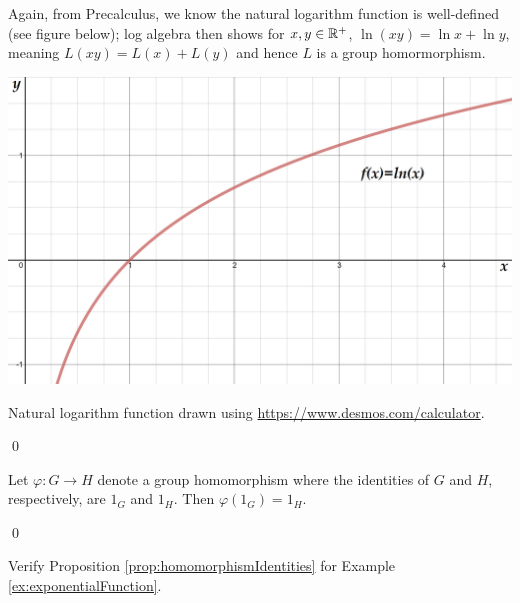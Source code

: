 \documentclass[../algebraNotesMSRI-UP2016.tex]{subfiles}
\begin{document}
\begin{frame}
Again, from Precalculus, we know the natural logarithm function is well-defined (see figure below); log algebra then shows for $x,y\in\mathbb R^+$, $\ln{(xy)}=\ln x+\ln y$, meaning $L(xy)=L(x)+L(y)$ and hence $L$ is a group homormorphism. 

\begin{center}
\includegraphics[scale=0.2]{lnFunction}

{\footnotesize Natural logarithm function drawn using \url{https://www.desmos.com/calculator}.}
\end{center}
\qed

\end{frame}

\begin{frame}[c]
\begin{prop}\label{prop:homomorphismIdentities}
Let $\varphi: G\to H$ denote a group homomorphism where the identities of $G$ and $H$, respectively, are $1_G$ and $1_H$.  Then $\varphi(1_G)=1_H$.

\qed
\end{prop}
%

\smallGap
\begin{exe}\label{exe:homomorphismIdentities}
Verify Proposition \ref{prop:homomorphismIdentities} for Example \ref{ex:exponentialFunction}.
\end{exe}
\end{frame}
\end{document}
